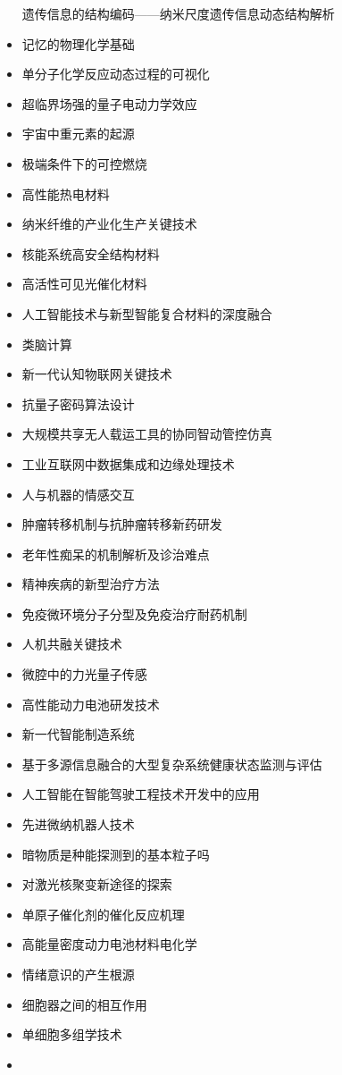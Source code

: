 \documentclass[]{tufte-book}
\begin{document}
\begin{itemize}
  遗传信息的结构编码------纳米尺度遗传信息动态结构解析
\item
  记忆的物理化学基础
\item
  单分子化学反应动态过程的可视化
\item
  超临界场强的量子电动力学效应
\item
  宇宙中重元素的起源
\item
  极端条件下的可控燃烧
\item
  高性能热电材料
\item
  纳米纤维的产业化生产关键技术
\item
  核能系统高安全结构材料
\item
  高活性可见光催化材料
\item
  人工智能技术与新型智能复合材料的深度融合
\item
  类脑计算
\item
  新一代认知物联网关键技术
\item
  抗量子密码算法设计
\item
  大规模共享无人载运工具的协同智动管控仿真
\item
  工业互联网中数据集成和边缘处理技术
\item
  人与机器的情感交互
\item
  肿瘤转移机制与抗肿瘤转移新药研发
\item
  老年性痴呆的机制解析及诊治难点
\item
  精神疾病的新型治疗方法
\item
  免疫微环境分子分型及免疫治疗耐药机制
\item
  人机共融关键技术
\item
  微腔中的力光量子传感
\item
  高性能动力电池研发技术
\item
  新一代智能制造系统
\item
  基于多源信息融合的大型复杂系统健康状态监测与评估
\item
  人工智能在智能驾驶工程技术开发中的应用
\item
  先进微纳机器人技术
\item
  暗物质是种能探测到的基本粒子吗
\item
  对激光核聚变新途径的探索
\item
  单原子催化剂的催化反应机理
\item
  高能量密度动力电池材料电化学
\item
  情绪意识的产生根源
\item
  细胞器之间的相互作用
\item
  单细胞多组学技术
\item

\end{itemize}
\end{document}

